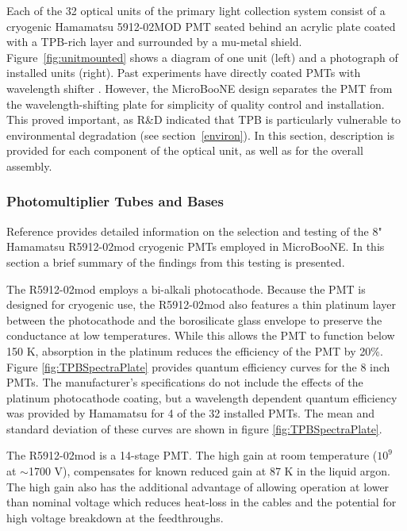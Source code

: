 Each of the 32 optical units of the primary light collection system consist of a cryogenic Hamamatsu 5912-02MOD PMT seated behind an acrylic plate coated with a TPB-rich layer and surrounded by a mu-metal shield. 
Figure~\ref{fig:unitmounted} shows a diagram of one unit (left) and a photograph of installed units (right).  Past experiments have directly coated PMTs with wavelength shifter \cite{Amerio:2004-T600}.  However, 
the MicroBooNE design separates the PMT from the wavelength-shifting plate for simplicity of quality control and installation.  This proved important, as R\&D indicated that TPB is particularly vulnerable to environmental degradation (see section~\ref{environ}).  In this section, description is provided for each component of the optical unit, as well as for the overall assembly.


\subsubsection{Photomultiplier Tubes and Bases}
\label{sec:pmt-bases}

Reference \cite{Briese:2013wua} provides detailed information on the selection 
and testing of the 8" Hamamatsu R5912-02mod cryogenic PMTs employed in MicroBooNE.   
In this section a brief summary of the findings from this testing is presented.

The R5912-02mod employs a bi-alkali photocathode.  Because the PMT is designed for cryogenic use, the R5912-02mod also features a thin platinum layer between the photocathode and the borosilicate glass envelope to preserve the conductance at low temperatures.   While this allows the PMT to function below 150 K, absorption in the platinum reduces the efficiency of the PMT by 20\%.
Figure \ref{fig:TPBSpectraPlate} provides quantum efficiency curves for the 8 inch PMTs. The manufacturer's specifications do not include the effects of the platinum photocathode coating, but a wavelength dependent quantum efficiency was provided by Hamamatsu for 4 of the 32 installed PMTs.  The mean and standard deviation of these curves are shown in figure \ref{fig:TPBSpectraPlate}. 

The  R5912-02mod is a 14-stage PMT.
The high gain at room temperature ($10^9$ at $\sim$1700 V), compensates for known reduced gain at 87 K in the liquid argon.  
The high gain also has the additional advantage of allowing operation at lower than nominal voltage which reduces heat-loss in the cables and the potential for high voltage breakdown at the feedthroughs.


